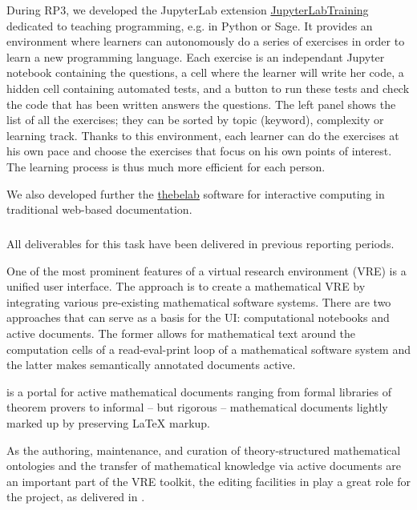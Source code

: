 
During RP3, we developed the JupyterLab extension
\href{https://gitlab.com/logilab/jupyterhub-training}{JupyterLabTraining}
dedicated to teaching programming, e.g. in Python or Sage.
It provides an environment where learners can autonomously do a
series of exercises in order to learn a new programming language. Each exercise is
an independant Jupyter notebook containing the questions, a cell where the learner will
write her code, a hidden cell containing automated tests, and a button to run these tests
and check the code that has been written answers the questions. The left panel shows
the list of all the exercises; they can be sorted by topic (keyword), complexity or
learning track. Thanks to this environment, each learner can do the exercises at his
own pace and choose the exercises that focus on his own points of interest. The
learning process is thus much more efficient for each person.

We also developed further the
\href{https://github.com/minrk/thebelab}{thebelab} software for
interactive computing in traditional web-based documentation.

\smallskip
\subparagraph{}
\label{UI@mathhub}

All deliverables for this task have been delivered in previous reporting periods.

One of the most prominent features of a virtual research environment (VRE) is a unified user interface. The \ODK approach is to create a mathematical VRE by integrating various pre-existing mathematical software systems. There are two approaches that can serve as a basis for the \ODK UI: computational notebooks and active documents. The former allows for mathematical text around the computation cells of a read-eval-print loop of a mathematical software system and the latter makes semantically annotated documents active.

\MathHub is a portal for active mathematical documents ranging from formal libraries of theorem provers to informal – but rigorous – mathematical documents lightly marked up by preserving LaTeX markup.

As the authoring, maintenance, and curation of theory-structured mathematical ontologies and the transfer of mathematical knowledge via active documents are an important part of the \ODK VRE toolkit, the editing facilities in \MathHub play a great role for the project,
as delivered in .

